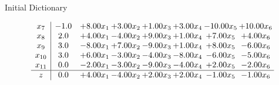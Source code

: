 \documentclass[8pt]{article}
\begin{document}
Initial Dictionary 

\[\begin{array}{c| c c@{\hskip 2pt} c@{\hskip 2pt} c@{\hskip 2pt} c@{\hskip 2pt} c@{\hskip 2pt} c@{\hskip 2pt} }
 x_{7}   &  -1.0 & +  8.00 x_{1} & +  3.00 x_{2} & +  1.00 x_{3} & +  3.00 x_{4} & -10.00 x_{5} & + 10.00 x_{6}\\
 x_{8}   &  2.0 & +  4.00 x_{1} & -4.00 x_{2} & +  9.00 x_{3} & +  1.00 x_{4} & +  7.00 x_{5} & +  4.00 x_{6}\\
 x_{9}   &  3.0 & -8.00 x_{1} & +  7.00 x_{2} & -9.00 x_{3} & +  1.00 x_{4} & +  8.00 x_{5} & -6.00 x_{6}\\
 x_{10}   &  3.0 & +  6.00 x_{1} & -3.00 x_{2} & -4.00 x_{3} & -8.00 x_{4} & -6.00 x_{5} & -5.00 x_{6}\\
 x_{11}   &  0.0 & -2.00 x_{1} & -3.00 x_{2} & -9.00 x_{3} & -4.00 x_{4} & +  2.00 x_{5} & -2.00 x_{6}\\
\hline
z    &  0.0 & +  4.00 x_{1} & -4.00 x_{2} & +  2.00 x_{3} & +  2.00 x_{4} & -1.00 x_{5} & -1.00 x_{6}\\
\end{array}\]
\end{document}
